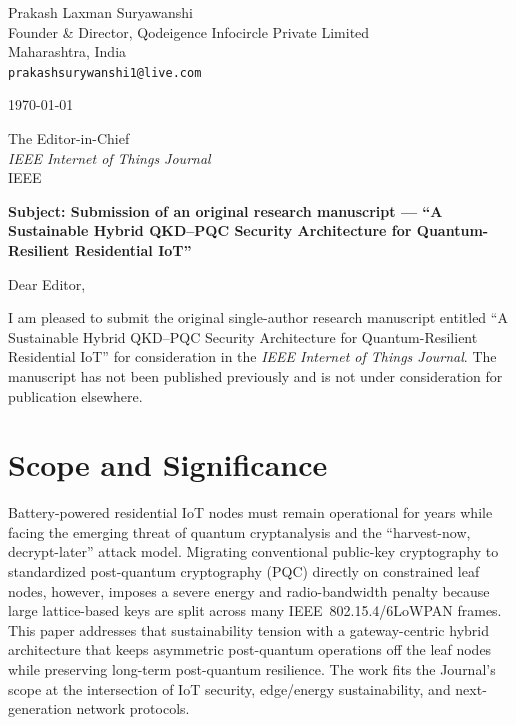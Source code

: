 \documentclass[11pt]{article}
\begin{document}
\begin{flushright}
Prakash Laxman Suryawanshi\\
Founder \& Director, Qodeigence Infocircle Private Limited\\
Maharashtra, India\\
\texttt{prakashsurywanshi1@live.com}
\end{flushright}

\vspace{0.5em}
\today

\vspace{1em}
The Editor-in-Chief\\
\textit{IEEE Internet of Things Journal}\\
IEEE

\vspace{1em}
\textbf{Subject: Submission of an original research manuscript --- ``A Sustainable Hybrid QKD--PQC Security Architecture for Quantum-Resilient Residential IoT''}

\vspace{0.5em}
Dear Editor,

I am pleased to submit the original single-author research manuscript entitled
``A Sustainable Hybrid QKD--PQC Security Architecture for Quantum-Resilient
Residential IoT'' for consideration in the \emph{IEEE Internet of Things Journal}.
The manuscript has not been published previously and is not under consideration
for publication elsewhere.

\section*{Scope and Significance}
Battery-powered residential IoT nodes must remain operational for years while facing
the emerging threat of quantum cryptanalysis and the ``harvest-now, decrypt-later''
attack model. Migrating conventional public-key cryptography to standardized
post-quantum cryptography (PQC) directly on constrained leaf nodes, however, imposes a
severe energy and radio-bandwidth penalty because large lattice-based keys are split
across many IEEE~802.15.4/6LoWPAN frames. This paper addresses that sustainability
tension with a gateway-centric hybrid architecture that keeps asymmetric post-quantum
operations off the leaf nodes while preserving long-term post-quantum resilience. The
work fits the Journal's scope at the intersection of IoT security, edge/energy
sustainability, and next-generation network protocols.
\end{document}
